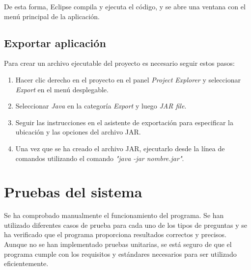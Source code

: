 De esta forma, Eclipse compila y ejecuta el código, y se abre una ventana con el menú principal de la aplicación.


\subsection{Exportar aplicación}
Para crear un archivo ejecutable del proyecto es necesario seguir estos pasos:
\begin{enumerate}
    \item Hacer clic derecho en el proyecto en el panel \textit{Project Explorer} y seleccionar \textit{Export} en el menú desplegable.
    \item Seleccionar \textit{Java} en la categoría \textit{Export} y luego \textit{JAR file}.
    \item Seguir las instrucciones en el asistente de exportación para especificar la ubicación y las opciones del archivo JAR.
    \item Una vez que se ha creado el archivo JAR, ejecutarlo desde la línea de comandos utilizando el comando \textit{"java -jar nombre.jar"}.
\end{enumerate}

\section{Pruebas del sistema}

Se ha comprobado manualmente el funcionamiento del programa. Se han utilizado diferentes casos de prueba para cada uno de los tipos de preguntas y se ha verificado que el programa proporciona resultados correctos y precisos. Aunque no se han implementado pruebas unitarias, se está seguro de que el programa cumple con los requisitos y estándares necesarios para ser utilizado eficientemente.
